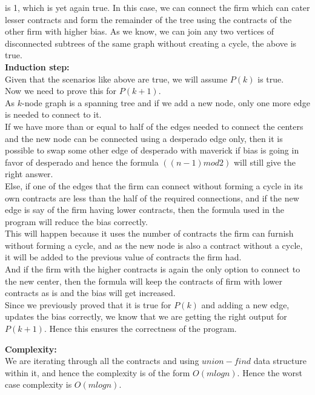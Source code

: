 \documentclass[12pt]{article}
\begin{document}
\begin{enumerate}
\begin{enumerate}
is 1, which is yet again true. In this case, we can connect the firm which can cater lesser contracts and form the remainder of the tree using the contracts of the other firm with higher bias. As we know, we can join any two vertices of disconnected subtrees of the same graph without creating a cycle, the above is true. \\
\textbf{Induction step:}\\
Given that the scenarios like above are true, we will assume $P(k)$ is true.\\
Now we need to prove this for $P(k+1)$.\\
As $k$-node graph is a spanning tree and if we add a new node, only one more edge is needed to connect to it. \\
If we have more than or equal to half of the edges needed to connect the centers and the new node can be connected using a desperado edge only, then it is possible to swap some other edge of desperado with maverick if bias is going in favor of desperado and hence the formula $((n - 1) mod 2)$ will still give the right answer.\\
Else, if one of the edges that the firm can connect without forming a cycle in its own contracts are less than the half of the required connections, and if the new edge is say of the firm having lower contracts, then the formula used in the program will reduce the bias correctly. \\
This will happen because it uses the number of contracts the firm can furnish without forming a cycle, and as the new node is also a contract without a cycle, it will be added to the previous value of contracts the firm had. \\
And if the firm with the higher contracts is again the only option to connect to the new center, then the formula will keep the contracts of firm with lower contracts as is and the bias will get increased.\\
Since we previously proved that it is true for $P(k)$ and adding a new edge, updates the bias correctly, we know that we are getting the right output for $P(k+1)$. Hence this ensures the correctness of the program.
\end{enumerate}

\textbf{Complexity:}\\We are iterating through all the contracts and using $union-find$ data structure within it, and hence the complexity is of the form $O(mlogn)$. Hence the worst case complexity is $O(mlogn)$.


\end{enumerate}
\end{document}
